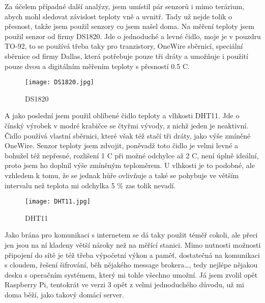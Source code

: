 Za účelem případné další analýzy, jsem umístil pár senzorů i mimo terárium, abych mohl sledovat závislost teploty vně 
a uvnitř. Tady už nejde tolik o přesnost, takže jsem použil senzory co jsem našel doma. Na měření teploty jsem použil 
senzor od firmy DS1820. Jde o jednoduché a levné čidlo, moje je v pouzdru TO-92, to se používá třeba taky pro 
tranzistory, OneWire sběrnicí, speciální sběrnice od firmy Dallas, která potřebuje pouze tři dráty a umožňuje i použití 
pouze dvou a digitálním měřením teploty s přesností 0.5 \textdegree C.
\begin{figure}[H]
		\centering
    \texttt{[image: DS1820.jpg]}
    \caption{DS1820}
\end{figure}

A jako poslední jsem použil oblíbené čidlo teploty a vlhkosti DHT11. Jde o čínský výrobek v modré krabičce se čtyřmi 
vývody, z nichž jeden je neaktivní. Čidlo používá vlastní sběrnici, které však též stačí tři dráty, jako výše zmíněné 
OneWire. Senzor teploty jsem zdvojit, poněvadž toto čidlo je velmi levné a bohužel též nepřesné, rozlišení 1 \textdegree C při 
možné odchylce až 2 \textdegree C, není úplně ideální, proto jsem ho doplnil výše zmíněným teploměrem. U vlhkosti je to podobné, 
ale vzhledem k tomu, že se jednak hůře ovlivňuje a také se pohybuje ve větším intervalu než teplota mi odchylka 5 \% zas 
tolik nevadí.
\begin{figure}[H]
		\centering
    \texttt{[image: DHT11.jpg]}
    \caption{DHT11}
\end{figure}

Jako brána pro komunikaci s internetem se dá taky použit téměř cokoli, ale přeci jen jsou na ní kladeny větší nároky než 
na měřící stanici. Mimo nutnosti možnosti připojení do sítě je též třeba výpočetní výkon a paměť, dostatečná na 
komunikaci s cloudem, řešení šifrování, běh nějakého message brokera\ldots, tedy nejlépe nějakou desku s operačním 
systémem, který mi tohle všechno umožní. Já jsem zvolil opět Raspberry Pi, tentokrát ve verzi 3 opět z velmi 
jednoduchého důvodu, už mi doma běží, jako takový domácí server.
